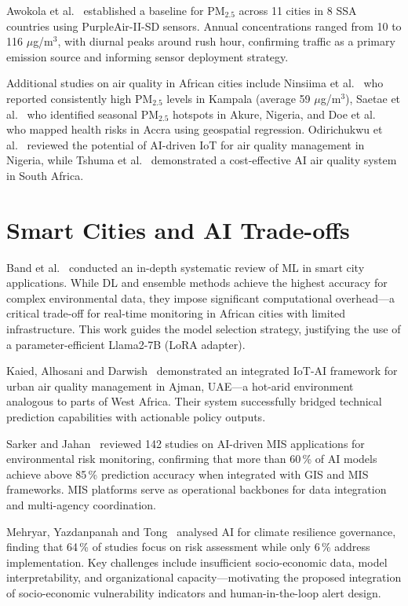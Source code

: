 Awokola et al.~\cite{awokola2022} established a baseline for PM$_{2.5}$ across 11 cities in 8 SSA countries using PurpleAir-II-SD sensors. Annual concentrations ranged from 10 to 116 $\mu$g/m$^3$, with diurnal peaks around rush hour, confirming traffic as a primary emission source and informing sensor deployment strategy.

Additional studies on air quality in African cities include Ninsiima et al.~\cite{Mackline_Ninsiima_2023} who reported consistently high PM$_{2.5}$ levels in Kampala (average 59 $\mu$g/m$^3$), Saetae et al.~\cite{Sawanya_Saetae_2024} who identified seasonal PM$_{2.5}$ hotspots in Akure, Nigeria, and Doe et al.~\cite{Eric_Kofi_Doe_2025} who mapped health risks in Accra using geospatial regression. Odirichukwu et al.~\cite{JC_Odirichukwu_2024} reviewed the potential of AI-driven IoT for air quality management in Nigeria, while Tshuma et al.~\cite{Methembe_Thomas_Tshuma_2024} demonstrated a cost-effective AI air quality system in South Africa.

\section{Smart Cities and AI Trade-offs}
Band et al.~\cite{band2022} conducted an in-depth systematic review of ML in smart city applications. While DL and ensemble methods achieve the highest accuracy for complex environmental data, they impose significant computational overhead—a critical trade-off for real-time monitoring in African cities with limited infrastructure. This work guides the model selection strategy, justifying the use of a parameter-efficient Llama2-7B (LoRA adapter).

Kaied, Alhosani and Darwish~\cite{kaied2025} demonstrated an integrated IoT-AI framework for urban air quality management in Ajman, UAE—a hot-arid environment analogous to parts of West Africa. Their system successfully bridged technical prediction capabilities with actionable policy outputs.

Sarker and Jahan~\cite{sarker2025} reviewed 142 studies on AI-driven MIS applications for environmental risk monitoring, confirming that more than 60\,\% of AI models achieve above 85\,\% prediction accuracy when integrated with GIS and MIS frameworks. MIS platforms serve as operational backbones for data integration and multi-agency coordination.

Mehryar, Yazdanpanah and Tong~\cite{mehryar2024} analysed AI for climate resilience governance, finding that 64\,\% of studies focus on risk assessment while only 6\,\% address implementation. Key challenges include insufficient socio-economic data, model interpretability, and organizational capacity—motivating the proposed integration of socio-economic vulnerability indicators and human-in-the-loop alert design.

